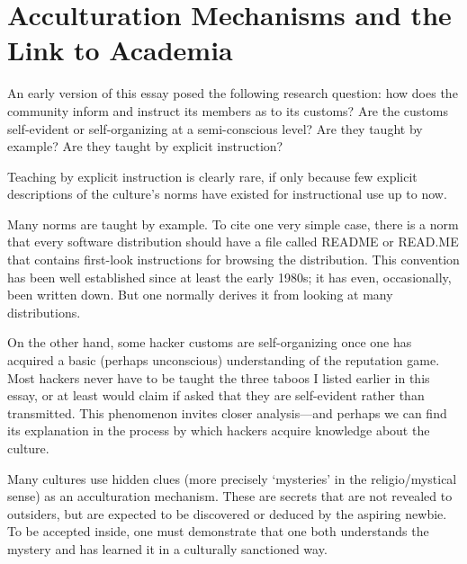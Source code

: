 \section{Acculturation Mechanisms and the Link to Academia}

An early version of this essay posed the following research question: how does
the community inform and instruct its members as to its customs? Are the customs
self-evident or self-organizing at a semi-conscious level? Are they taught by
example? Are they taught by explicit instruction?

Teaching by explicit instruction is clearly rare, if only because few explicit
descriptions of the culture's norms have existed for instructional use up to
now.

Many norms are taught by example.  To cite one very simple case, there is a norm
that every software distribution should have a file called README or READ.ME
that contains first-look instructions for browsing the distribution.  This
convention has been well established since at least the early 1980s; it has
even, occasionally, been written down.  But one normally derives it from looking
at many distributions.

On the other hand, some hacker customs are self-organizing once one has acquired
a basic (perhaps unconscious) understanding of the reputation game.  Most
hackers never have to be taught the three taboos I listed earlier in this essay,
or at least would claim if asked that they are self-evident rather than
transmitted.  This phenomenon invites closer analysis—and perhaps we can find
its explanation in the process by which hackers acquire knowledge about the
culture.

Many cultures use hidden clues (more precisely `mysteries' in the
religio/mystical sense) as an acculturation mechanism.  These are secrets that
are not revealed to outsiders, but are expected to be discovered or deduced by
the aspiring newbie.  To be accepted inside, one must demonstrate that one both
understands the mystery and has learned it in a culturally sanctioned way.

